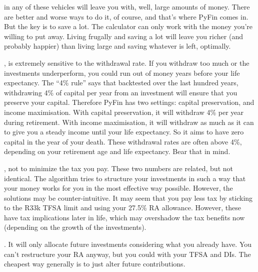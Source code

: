 \documentclass[a4paper, justified]{tufte-handout}
\begin{document}
 in any of these vehicles will leave you with, well, large amounts of money. There are better and worse ways to do it, of course, and that's where PyFin comes in. But the key is to save a lot. The calculator can only work with the money you're willing to put away. Living frugally and saving a lot will leave you richer (and probably happier) than living large and saving whatever is left, optimally.

, is extremely sensitive to the withdrawal rate. If you withdraw too much or the investments underperform, you could run out of money years before your life expectancy. The ``4\% rule'' says that backtested over the last hundred years, withdrawing 4\% of capital per year from an investment will ensure that you preserve your capital. Therefore PyFin has two settings: capital preservation, and income maximisation. With capital preservation, it will withdraw 4\% per year during retirement. With income maximisation, it will withdraw as much as it can to give you a steady income until your life expectancy. So it aims to have zero capital in the year of your death. These withdrawal rates are often above 4\%, depending on your retirement age and life expectancy. Bear that in mind.

, not to minimize the tax you pay. These two numbers are related, but not identical. The algorithm tries to structure your investments in such a way that your money works for you in the most effective way possible. However, the solutions may be counter-intuitive. It may seem that you pay less tax by sticking to the R33k TFSA limit and using your 27.5\% RA allowance. However, these have tax implications later in life, which may overshadow the tax benefits now (depending on the growth of the investments). 

. It will only allocate future investments considering what you already have. You can't restructure your RA anyway, but you could with your TFSA and DIs. The cheapest way generally is to just alter future contributions.
\end{document}
